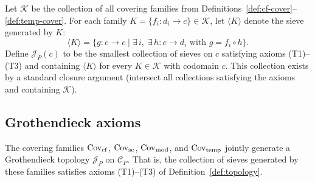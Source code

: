 \documentclass[11pt]{article}
\begin{document}
\begin{construction}\label{con:generated}
Let $\mathscr{K}$ be the collection of all covering families from
Definitions~\ref{def:cf-cover}--\ref{def:temp-cover}.  For each family
$K = \{f_i \colon d_i \to c\} \in \mathscr{K}$, let $\langle K \rangle$
denote the sieve generated by $K$:
\[
  \langle K \rangle = \{g \colon e \to c \mid
    \exists\, i,\; \exists\, h \colon e \to d_i \text{ with } g = f_i \circ h\}.
\]
Define $\mathscr{J}_P(c)$ to be the smallest collection of sieves on $c$
satisfying axioms \textnormal{(T1)--(T3)} and containing $\langle K \rangle$
for every $K \in \mathscr{K}$ with codomain $c$.  This collection exists
by a standard closure argument (intersect all collections satisfying the
axioms and containing $\mathscr{K}$).
\end{construction}

\subsection{Grothendieck axioms}

\begin{theorem}\label{thm:axioms}
The covering families $\mathrm{Cov}_{\mathrm{cf}}$, $\mathrm{Cov}_{\mathrm{sc}}$,
$\mathrm{Cov}_{\mathrm{mod}}$, and $\mathrm{Cov}_{\mathrm{temp}}$ jointly generate a
Grothendieck topology $\mathscr{J}_P$ on $\mathcal{C}_P$.  That is, the
collection of sieves generated by these families satisfies axioms \textnormal{(T1)--(T3)} of
Definition~\ref{def:topology}.
\end{theorem}
\end{document}
